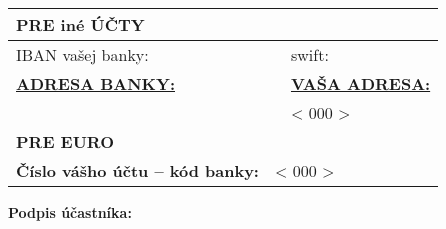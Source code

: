 \documentclass[10pt,a4paper]{article}
\newcommand{\placeholder}[1]{< #1 >}
\newcommand{\iban}{\placeholder{000}}
\newcommand{\address}{\placeholder{000}}
\begin{document}
	\vspace*{-1em}
	
	\begin{table}[h!]
		\centering
		\begin{tabularx}{\linewidth}{|lXXX|}
			\hline
			\multicolumn{4}{|l|}{\textbf{PRE iné ÚČTY}} \\ \hline
			\multicolumn{1}{|l|}{IBAN vašej banky:} & \multicolumn{1}{X|}{} & \multicolumn{1}{l|}{swift:} &  \\ \hline
			\multicolumn{2}{|l|}{{\underline{\textbf{ADRESA BANKY:}}}} & \multicolumn{2}{l|}{{\underline{\textbf{VAŠA ADRESA:}}}} \\ \hline
			\multicolumn{2}{|l|}{} & \multicolumn{2}{l|}{\address} \\ \hline
			\multicolumn{4}{|l|}{\textbf{PRE EURO}} \\ \hline
			\multicolumn{1}{|l|}{\textbf{Číslo vášho účtu -- kód banky:}} & \multicolumn{3}{l|}{\iban} \\ \hline
		\end{tabularx}
	\end{table}
	
	\begin{flushright}
		\textbf{Podpis účastníka:} \hspace*{3em} \makebox[2in]{\hrulefill}
	\end{flushright}
	
\end{document}
